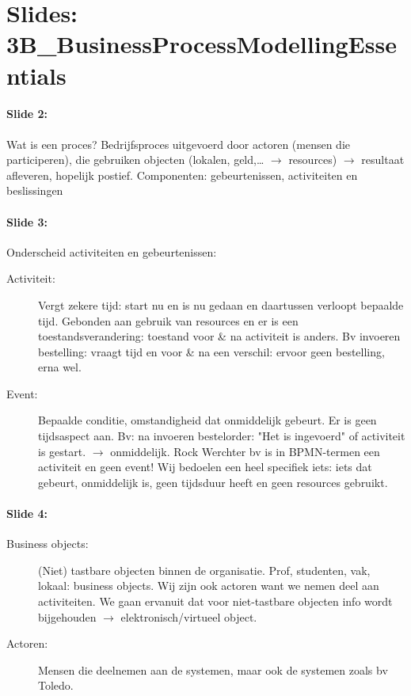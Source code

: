 \documentclass[10pt,a4paper]{report}
\begin{document}
\section{Slides: 3B\_BusinessProcessModellingEssentials}
\paragraph{Slide 2:}Wat is een proces? Bedrijfsproces uitgevoerd door actoren (mensen die participeren), die gebruiken objecten (lokalen, geld,… $\rightarrow$ resources) $\rightarrow$ resultaat afleveren, hopelijk postief. Componenten: gebeurtenissen, activiteiten en beslissingen

\paragraph{Slide 3:}Onderscheid activiteiten en gebeurtenissen:
\begin{description}
\item[Activiteit:]Vergt zekere tijd: start nu en is nu gedaan en daartussen verloopt bepaalde tijd. Gebonden aan gebruik van resources en er is een toestandsverandering: toestand voor \& na activiteit is anders. Bv invoeren bestelling: vraagt tijd en voor \& na een verschil: ervoor geen bestelling, erna wel.
\item[Event:]Bepaalde conditie, omstandigheid dat onmiddelijk gebeurt. Er is geen tijdsaspect aan. Bv: na invoeren bestelorder: "Het is ingevoerd" of activiteit is gestart. $\rightarrow$ onmiddelijk. Rock Werchter bv is in BPMN-termen een activiteit en geen event! Wij bedoelen een heel specifiek iets: iets dat gebeurt, onmiddelijk is, geen tijdsduur heeft en geen resources gebruikt.
\end{description}

\paragraph{Slide 4:}
\begin{description}
\item[Business objects:](Niet) tastbare objecten binnen de organisatie. Prof, studenten, vak, lokaal: business objects. Wij zijn ook actoren want we nemen deel aan activiteiten. We gaan ervanuit dat voor niet-tastbare objecten info wordt bijgehouden $\rightarrow$ elektronisch/virtueel object.
\item[Actoren:]Mensen die deelnemen aan de systemen, maar ook de systemen zoals bv Toledo.
\end{description}
\end{document}
